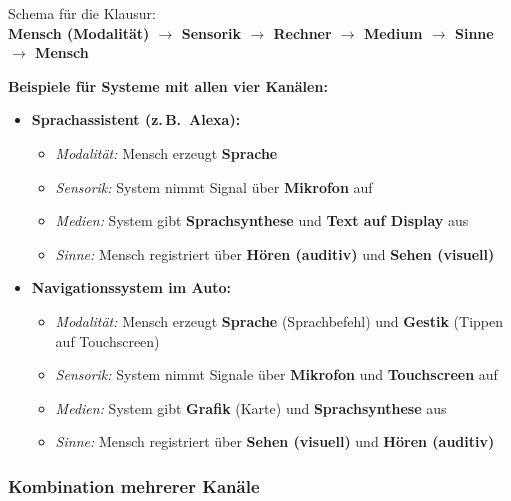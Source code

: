 \documentclass[12pt, a4paper]{article}
\begin{document}
\begin{notebox}
  Schema für die Klausur:\\
  \textbf{Mensch (Modalität) $\rightarrow$ Sensorik $\rightarrow$ Rechner
  $\rightarrow$ Medium $\rightarrow$ Sinne $\rightarrow$ Mensch}
\end{notebox}

\textbf{Beispiele für Systeme mit allen vier Kanälen:}

\begin{itemize}
  \item \textbf{Sprachassistent (z.\,B.\ Alexa):}
    \begin{itemize}
      \item \textit{Modalität:} Mensch erzeugt \textbf{Sprache}
      \item \textit{Sensorik:} System nimmt Signal über \textbf{Mikrofon} auf
      \item \textit{Medien:} System gibt \textbf{Sprachsynthese} und \textbf{Text auf Display} aus
      \item \textit{Sinne:} Mensch registriert über \textbf{Hören (auditiv)} und \textbf{Sehen (visuell)}
    \end{itemize}

  \item \textbf{Navigationssystem im Auto:}
    \begin{itemize}
      \item \textit{Modalität:} Mensch erzeugt \textbf{Sprache} (Sprachbefehl) und \textbf{Gestik} (Tippen auf Touchscreen)
      \item \textit{Sensorik:} System nimmt Signale über \textbf{Mikrofon} und \textbf{Touchscreen} auf
      \item \textit{Medien:} System gibt \textbf{Grafik} (Karte) und \textbf{Sprachsynthese} aus
      \item \textit{Sinne:} Mensch registriert über \textbf{Sehen (visuell)} und \textbf{Hören (auditiv)}
    \end{itemize}
\end{itemize}

\subsubsection{Kombination mehrerer Kanäle}
\end{document}
